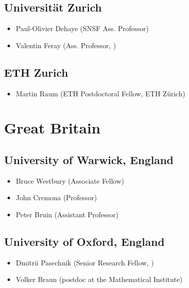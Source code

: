 \subsection*{Universität Zurich}
\begin{itemize}
\item Paul-Olivier Dehaye (SNSF Ass. Professor)
\item Valentin Feray (Ass. Professor, \MATH)
\end{itemize}
\subsection*{ETH Zurich}
\begin{itemize}
\item Martin Raum (ETH Postdoctoral Fellow, ETH Zürich)
\end{itemize}

\section*{Great Britain}
\subsection*{University of Warwick, England}
\begin{itemize}
\item Bruce Westbury (Associate Fellow)
\item John Cremona (Professor)
\item Peter Bruin (Assistant Professor)
\end{itemize}

\subsection*{University of Oxford, England}
\begin{itemize} 
\item Dmitrii Pasechnik (Senior Research Fellow, \CS)
\item Volker Braun (postdoc at the Mathematical Institute)
\end{itemize}

